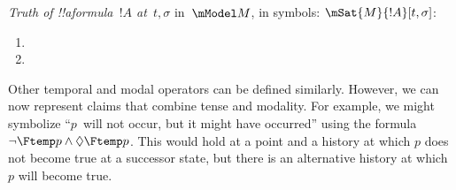 \documentclass[../../../include/open-logic-section]{subfiles}
\begin{document}
\begin{defn}
  \emph{Truth of !!a{formula}~$!A$ at~$t, \sigma$} in~$\mModel M$, in symbols:
  $\mSat{M}{!A}[t, \sigma]$:
  \begin{enumerate}
  \item{} 
  \item{} 
  \end{enumerate} 
\end{defn}

Other temporal and modal operators can be defined similarly. However,
we can now represent claims that combine tense and modality. For
example, we might symbolize ``$p$~will not occur, but it might have
occurred'' using the formula $\lnot \Ftemp p \land \Diamond \Ftemp p$.
This would hold at a point and a history at which $p$ does not become
true at a successor state, but there is an alternative history at
which $p$ will become true. 
\end{document}
